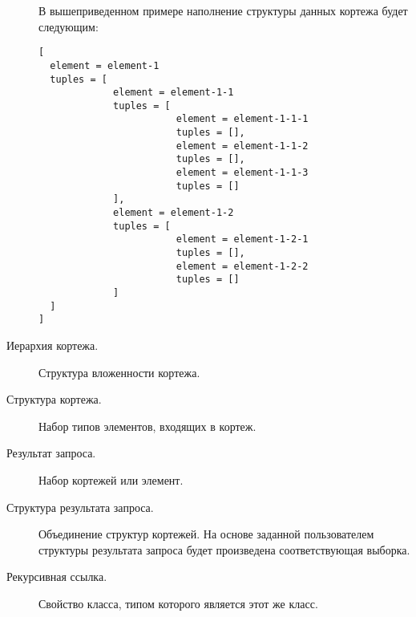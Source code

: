 \begin{description}
\begin{center}
\begin{tabular}{|l|l|l|}
	\hline
    \end{tabular}
\end{center}
В вышеприведенном примере наполнение структуры данных кортежа будет следующим:
\begin{verbatim}
[
  element = element-1
  tuples = [ 
             element = element-1-1
             tuples = [
                        element = element-1-1-1
                        tuples = [], 
                        element = element-1-1-2
                        tuples = [], 
                        element = element-1-1-3
                        tuples = []
             ],
             element = element-1-2
             tuples = [
                        element = element-1-2-1
                        tuples = [], 
                        element = element-1-2-2
                        tuples = []
             ]
  ]
]
\end{verbatim}


    \item [Иерархия кортежа.] Структура вложенности кортежа.
    \item [Структура кортежа.] Набор типов элементов, входящих в кортеж.
    \item [Результат запроса.] Набор кортежей или элемент.
    \item [Структура результата запроса.] Объединение структур кортежей. На основе заданной
пользователем структуры результата запроса будет произведена соответствующая выборка.
    \item [Рекурсивная ссылка.] Свойство класса, типом которого является этот же класс.

\end{description}


